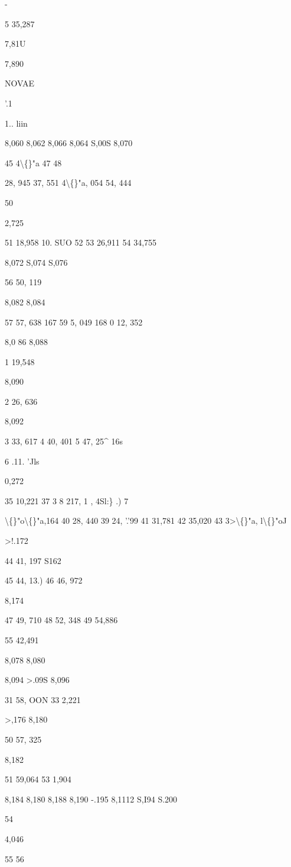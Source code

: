 \documentclass[10pt,a4paper]{article}
\begin{document}
-

5 35,287

7,81U

7,890

NOVAE

'.1

1.. liin

8,060
8,062
8,066
8,064
S,00S
8,070

45
4\textbackslash\{\}"a
47
48

28, 945
37, 551
4\textbackslash\{\}"a, 054
54, 444

50

2,725

51 18,958
10. SUO
52
53 26,911
54 34,755

8,072
S,074
S,076

56 50, 119

8,082
8,084

57 57, 638
167 59
5, 049
168 0 12, 352

8,0 86
8,088

1 19,548

8,090

2 26, 636

8,092

3 33, 617
4 40, 401
5 47, 25\textasciicircum{}
16s

6 .11. 'Jls

0,272

35 10,221
37
3 8 217,
1 , 4Sl:\}
.) 7

\textbackslash\{\}"o\textbackslash\{\}"a,164
40
28, 440
39 24,
'.'99
41
31,781
42 35,020
43 3>\textbackslash\{\}"a, l\textbackslash\{\}"oJ

>!.172

44 41, 197
S162

45 44, 13.)
46 46, 972

8,174

47 49, 710
48 52, 348
49 54,886

55 42,491

8,078
8,080

8,094
>.09S
8,096

31 58,
OON
33
2,221

>,176
8,180

50 57, 325

8,182

51 59,064
53 1,904

8,184
8,180
8,188
8,190
-.195
8,1112
S,I94
S.200

54

4,046

55
56
\end{document}

